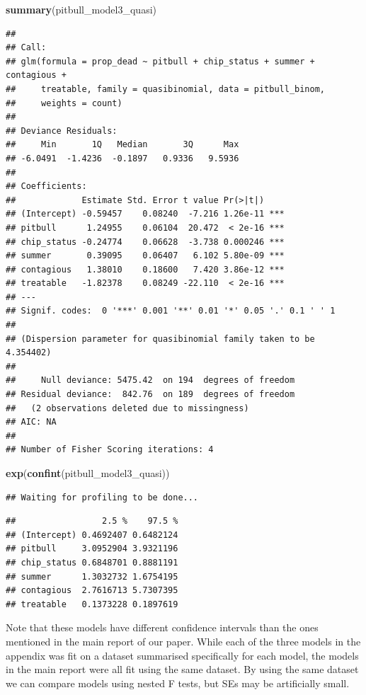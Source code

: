 \documentclass[]{article}
\newenvironment{Shaded}{\begin{snugshade}}{\end{snugshade}}
\newcommand{\KeywordTok}[1]{\textcolor[rgb]{0.13,0.29,0.53}{\textbf{#1}}}
\newcommand{\NormalTok}[1]{#1}
\begin{document}
\begin{Shaded}
\begin{Highlighting}[]
\KeywordTok{summary}\NormalTok{(pitbull_model3_quasi)}
\end{Highlighting}
\end{Shaded}

\begin{verbatim}
## 
## Call:
## glm(formula = prop_dead ~ pitbull + chip_status + summer + contagious + 
##     treatable, family = quasibinomial, data = pitbull_binom, 
##     weights = count)
## 
## Deviance Residuals: 
##     Min       1Q   Median       3Q      Max  
## -6.0491  -1.4236  -0.1897   0.9336   9.5936  
## 
## Coefficients:
##             Estimate Std. Error t value Pr(>|t|)    
## (Intercept) -0.59457    0.08240  -7.216 1.26e-11 ***
## pitbull      1.24955    0.06104  20.472  < 2e-16 ***
## chip_status -0.24774    0.06628  -3.738 0.000246 ***
## summer       0.39095    0.06407   6.102 5.80e-09 ***
## contagious   1.38010    0.18600   7.420 3.86e-12 ***
## treatable   -1.82378    0.08249 -22.110  < 2e-16 ***
## ---
## Signif. codes:  0 '***' 0.001 '**' 0.01 '*' 0.05 '.' 0.1 ' ' 1
## 
## (Dispersion parameter for quasibinomial family taken to be 4.354402)
## 
##     Null deviance: 5475.42  on 194  degrees of freedom
## Residual deviance:  842.76  on 189  degrees of freedom
##   (2 observations deleted due to missingness)
## AIC: NA
## 
## Number of Fisher Scoring iterations: 4
\end{verbatim}

\begin{Shaded}
\begin{Highlighting}[]
\KeywordTok{exp}\NormalTok{(}\KeywordTok{confint}\NormalTok{(pitbull_model3_quasi))}
\end{Highlighting}
\end{Shaded}

\begin{verbatim}
## Waiting for profiling to be done...
\end{verbatim}

\begin{verbatim}
##                 2.5 %    97.5 %
## (Intercept) 0.4692407 0.6482124
## pitbull     3.0952904 3.9321196
## chip_status 0.6848701 0.8881191
## summer      1.3032732 1.6754195
## contagious  2.7616713 5.7307395
## treatable   0.1373228 0.1897619
\end{verbatim}

Note that these models have different confidence intervals than the ones
mentioned in the main report of our paper. While each of the three
models in the appendix was fit on a dataset summarised specifically for
each model, the models in the main report were all fit using the same
dataset. By using the same dataset we can compare models using nested F
tests, but SEs may be artificially small.
\end{document}

